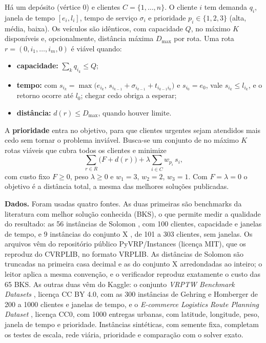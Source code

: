 \documentclass[12pt]{article}
\begin{document}
Há um depósito (vértice $0$) e clientes $C=\{1,\dots,n\}$. O cliente $i$ tem demanda $q_i$, janela de tempo $[e_i,l_i]$, tempo de serviço $\sigma_i$ e prioridade $p_i\in\{1,2,3\}$ (alta, média, baixa). Os veículos são idênticos, com capacidade $Q$, no máximo $K$ disponíveis e, opcionalmente, distância máxima $D_{\max}$ por rota. Uma rota $r=(0,i_1,\dots,i_m,0)$ é viável quando:
\begin{itemize}
  \item \textbf{capacidade:} $\sum_k q_{i_k}\le Q$;
  \item \textbf{tempo:} com $s_{i_k}=\max\bigl(e_{i_k},\,s_{i_{k-1}}+\sigma_{i_{k-1}}+t_{i_{k-1}i_k}\bigr)$ e $s_{i_0}=e_0$, vale $s_{i_k}\le l_{i_k}$, e o retorno ocorre até $l_0$; chegar cedo obriga a esperar;
  \item \textbf{distância:} $d(r)\le D_{\max}$, quando houver limite.
\end{itemize}
A \textbf{prioridade} entra no objetivo, para que clientes urgentes sejam atendidos mais cedo sem tornar o problema inviável. Busca-se um conjunto de no máximo $K$ rotas viáveis que cubra todos os clientes e minimize
\begin{equation}
\sum_{r\in R}\bigl(F+d(r)\bigr)+\lambda\sum_{i\in C}w_{p_i}\,s_i,
\label{eq:obj}
\end{equation}
com custo fixo $F\ge0$, peso $\lambda\ge0$ e $w_1=3$, $w_2=2$, $w_3=1$. Com $F=\lambda=0$ o objetivo é a distância total, a mesma das melhores soluções publicadas.

\textbf{Dados.} Foram usadas quatro fontes. As duas primeiras são benchmarks da literatura com melhor solução conhecida (BKS), o que permite medir a qualidade do resultado: as 56 instâncias de Solomon \cite{solomon1987}, com 100 clientes, capacidade e janelas de tempo, e 9 instâncias do conjunto X \cite{uchoa2017}, de 101 a 303 clientes, sem janelas. Os arquivos vêm do repositório público PyVRP/Instances (licença MIT), que os reproduz do CVRPLIB, no formato VRPLIB. As distâncias de Solomon são truncadas na primeira casa decimal e as do conjunto X arredondadas ao inteiro; o leitor aplica a mesma convenção, e o verificador reproduz exatamente o custo das 65 BKS. As outras duas vêm do Kaggle: o conjunto \emph{VRPTW Benchmark Datasets} \cite{kagglevrptw}, licença CC BY 4.0, com as 300 instâncias de Gehring e Homberger \cite{gehring1999} de 200 a 1000 clientes e janelas de tempo, e o \emph{E-commerce Logistics Route Planning Dataset} \cite{kaggleecom}, licença CC0, com 1000 entregas urbanas, com latitude, longitude, peso, janela de tempo e prioridade. Instâncias sintéticas, com semente fixa, completam os testes de escala, rede viária, prioridade e comparação com o solver exato.
\end{document}
